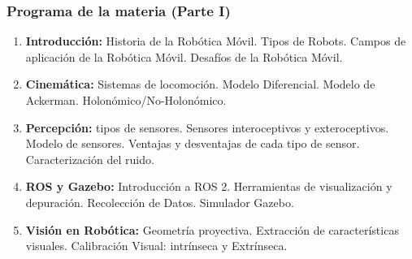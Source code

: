 \begin{frame}
	\frametitle{Programa de la materia (Parte I)}
	\footnotesize
	\begin{enumerate}
		\item {\bf Introducción:} Historia de la Robótica Móvil. Tipos de Robots. Campos de aplicación de la Robótica Móvil. Desafíos de la Robótica Móvil.
		
		\item {\bf Cinemática:} Sistemas de locomoción. Modelo Diferencial. Modelo de Ackerman. Holonómico/No-Holonómico.
		
		\item {\bf Percepción:} tipos de sensores. Sensores interoceptivos y exteroceptivos. Modelo de sensores. Ventajas y desventajas de cada tipo de sensor. Caracterización del ruido.
		
		\item {\bf ROS y Gazebo:} Introducción a ROS 2. Herramientas de visualización y depuración. Recolección de Datos. Simulador Gazebo.
		
		\item {\bf Visión en Robótica:} Geometría proyectiva. Extracción de características visuales. Calibración Visual: intrínseca y Extrínseca. 
		
	\end{enumerate}

\end{frame}

